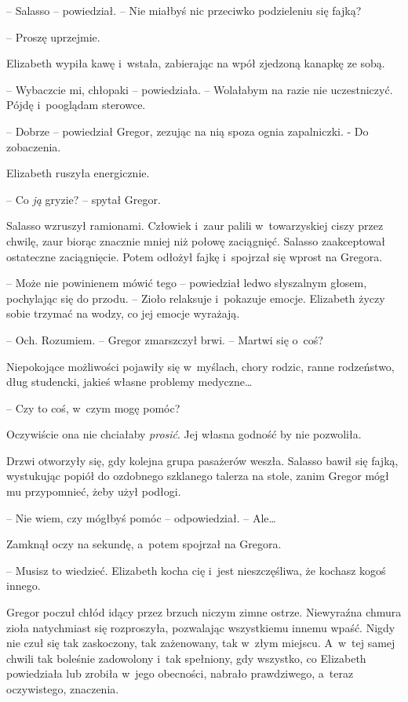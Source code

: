 \documentclass[oneside,polish,12pt,sfheadings]{mwbk}
\begin{document}
-- Salasso -- powiedział. -- Nie miałbyś nic przeciwko podzieleniu się
fajką?

-- Proszę uprzejmie.

Elizabeth wypiła kawę i~wstała, zabierając na wpół zjedzoną kanapkę ze
sobą.

-- Wybaczcie mi, chłopaki -- powiedziała. -- Wolałabym na razie nie
uczestniczyć. Pójdę i~pooglądam sterowce.

-- Dobrze -- powiedział Gregor, zezując na nią spoza ognia zapalniczki. -
Do zobaczenia.

Elizabeth ruszyła energicznie.

-- Co \emph{ją} gryzie? -- spytał Gregor.

Salasso wzruszył ramionami. Człowiek i~zaur palili w~towarzyskiej ciszy
przez chwilę, zaur biorąc znacznie mniej niż połowę zaciągnięć. Salasso
zaakceptował ostateczne zaciągnięcie. Potem odłożył fajkę i~spojrzał się
wprost na Gregora.

-- Może nie powinienem mówić tego -- powiedział ledwo słyszalnym głosem,
pochylając się do przodu. -- Zioło relaksuje i~pokazuje emocje. Elizabeth
życzy sobie trzymać na wodzy, co jej emocje wyrażają.

-- Och. Rozumiem. -- Gregor zmarszczył brwi. -- Martwi się o~coś?

Niepokojące możliwości pojawiły się w~myślach, chory rodzic, ranne
rodzeństwo, dług studencki, jakieś własne problemy medyczne\ldots

-- Czy to coś, w~czym mogę pomóc?

Oczywiście ona nie chciałaby \emph{prosić}. Jej własna godność by nie
pozwoliła.

Drzwi otworzyły się, gdy kolejna grupa pasażerów weszła. Salasso bawił
się fajką, wystukując popiół do ozdobnego szklanego talerza na stole,
zanim Gregor mógł mu przypomnieć, żeby użył podłogi.

-- Nie wiem, czy mógłbyś pomóc -- odpowiedział. -- Ale\ldots

Zamknął oczy na sekundę, a~potem spojrzał na Gregora.

-- Musisz to wiedzieć. Elizabeth kocha cię i~jest nieszczęśliwa, że
kochasz kogoś innego.

Gregor poczuł chłód idący przez brzuch niczym zimne ostrze. Niewyraźna
chmura zioła natychmiast się rozproszyła, pozwalając wszystkiemu innemu
wpaść. Nigdy nie czuł się tak zaskoczony, tak zażenowany, tak w~złym
miejscu. A~w~tej samej chwili tak boleśnie zadowolony i~tak spełniony,
gdy wszystko, co Elizabeth powiedziała lub zrobiła w~jego obecności,
nabrało prawdziwego, a~teraz oczywistego, znaczenia.
\end{document}
